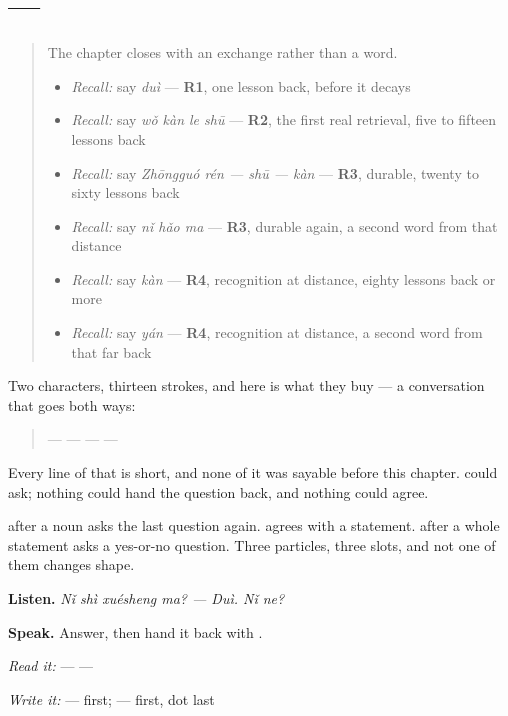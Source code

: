 \section[Practice]{ — }

\label{lesson:ZH-C26-practice}



\begin{quote}
The chapter closes with an exchange rather than a word.

\begin{itemize}
\raggedright
  \item \emph{Recall:} say \emph{duì} — \textbf{R1}, one lesson back, before it decays
  \item \emph{Recall:} say \emph{wǒ kàn le shū} — \textbf{R2}, the first real retrieval, five to fifteen lessons back
  \item \emph{Recall:} say \emph{Zhōngguó rén — shū — kàn} — \textbf{R3}, durable, twenty to sixty lessons back
  \item \emph{Recall:} say \emph{nǐ hǎo ma} — \textbf{R3}, durable again, a second word from that distance
  \item \emph{Recall:} say \emph{kàn} — \textbf{R4}, recognition at distance, eighty lessons back or more
  \item \emph{Recall:} say \emph{yán} — \textbf{R4}, recognition at distance, a second word from that far back
\end{itemize}
\end{quote}

\begin{grammarlens}[title={What you've built — a turn each way}]
Two characters, thirteen strokes, and here is what they buy — a conversation that goes both ways:

\begin{quote}
— \textbf{} — \textbf{} — \textbf{} — \textbf{}
\end{quote}

Every line of that is short, and none of it was sayable before this chapter.  could ask; nothing could hand the question back, and nothing could agree.

\textbf{} after a noun asks the last question again. \textbf{} agrees with a statement. \textbf{} after a whole statement asks a yes-or-no question. Three particles, three slots, and not one of them changes shape.

\textbf{Listen.} \emph{Nǐ shì xuésheng ma? — Duì. Nǐ ne?}

\textbf{Speak.} Answer, then hand it back with .

\emph{Read it:}  —  — 

\emph{Write it:}  —  first;  —  first, dot last
\end{grammarlens}

